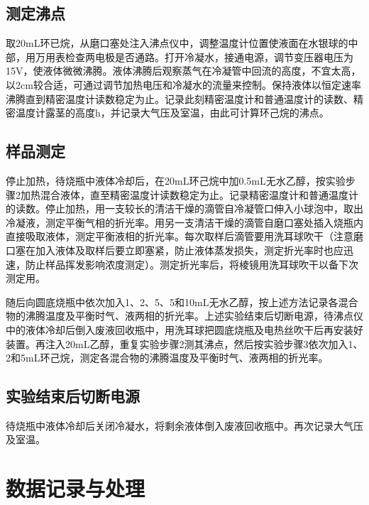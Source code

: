 \documentclass[12pt,hyperref,a4paper,UTF8]{ctexart}
\begin{document}
\subsection{测定沸点}
取20mL环已烷，从磨口塞处注入沸点仪中，调整温度计位置使液面在水银球的中部，用万用表检查两电极是否通路。打开冷凝水，接通电源，调节变压器电压为15V，使液体微微沸腾。液体沸腾后观察蒸气在冷凝管中回流的高度，不宜太高，以2cm较合适，可通过调节加热电压和冷凝水的流量来控制。保持液体以恒定速率沸腾直到精密温度计读数稳定为止。记录此刻精密温度计和普通温度计的读数、精密温度计露茎的高度h，并记录大气压及室温，由此可计算环己烷的沸点。
\subsection{样品测定}
停止加热，待烧瓶中液体冷却后，在20mL环己烷中加0.5mL无水乙醇，按实验步骤2加热混合液体，直至精密温度计读数稳定为止。记录精密温度计和普通温度计的读数。停止加热，用一支较长的清洁干燥的滴管自冷凝管口伸入小球泡中，取出冷凝液，测定平衡气相的折光率。用另一支清洁干燥的滴管自磨口塞处插入烧瓶内直接吸取液体，测定平衡液相的折光率。每次取样后滴管要用洗耳球吹干（注意磨口塞在加入液体及取样后要立即塞紧，防止液体蒸发损失，测定折光率时也应迅速，防止样品挥发影响浓度测定）。测定折光率后，将棱镜用洗耳球吹干以备下次测定用。

随后向圆底烧瓶中依次加入1、2、5、5和10mL无水乙醇，按上述方法记录各混合物的沸腾温度及平衡时气、液两相的折光率。上述实验结束后切断电源，待沸点仪中的液体冷却后倒入废液回收瓶中，用洗耳球把圆底烧瓶及电热丝吹干后再安装好装置。再注入20mL乙醇，重复实验步骤2测其沸点，然后按实验步骤3依次加入1、2和5mL环己烷，测定各混合物的沸腾温度及平衡时气、液两相的折光率。

\subsection{实验结束后切断电源}
待烧瓶中液体冷却后关闭冷凝水，将剩余液体倒入废液回收瓶中。再次记录大气压及室温。
\clearpage
\section{数据记录与处理}
\end{document}
